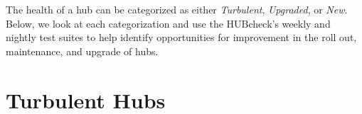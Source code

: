 The health of a hub can be categorized as either \textit{Turbulent},
\textit{Upgraded}, or \textit{New}. Below, we look at each categorization and
use the HUBcheck's weekly and nightly test suites to help identify
opportunities for improvement in the roll out, maintenance, and upgrade of hubs.


\section{Turbulent Hubs}
\label{sec:solution_turbulent}
%





